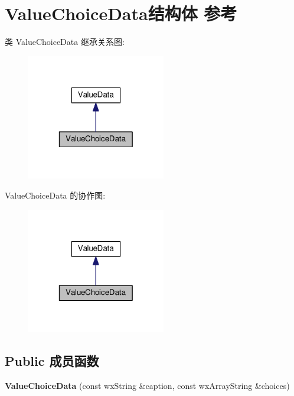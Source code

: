 \hypertarget{struct_value_choice_data}{\section{Value\+Choice\+Data结构体 参考}
\label{struct_value_choice_data}
}


类 Value\+Choice\+Data 继承关系图\+:
\nopagebreak
\begin{figure}[H]
\begin{center}
\leavevmode
\includegraphics[width=172pt]{struct_value_choice_data__inherit__graph}
\end{center}
\end{figure}


Value\+Choice\+Data 的协作图\+:
\nopagebreak
\begin{figure}[H]
\begin{center}
\leavevmode
\includegraphics[width=172pt]{struct_value_choice_data__coll__graph}
\end{center}
\end{figure}
\subsection*{Public 成员函数}
\begin{DoxyCompactItemize}
\item 
\hypertarget{struct_value_choice_data_aa00dc4e811c91b45b0f9f9fbf72b35ea}{{\bfseries Value\+Choice\+Data} (const wx\+String \&caption, const wx\+Array\+String \&choices)}\label{struct_value_choice_data_aa00dc4e811c91b45b0f9f9fbf72b35ea}

\end{DoxyCompactItemize}
